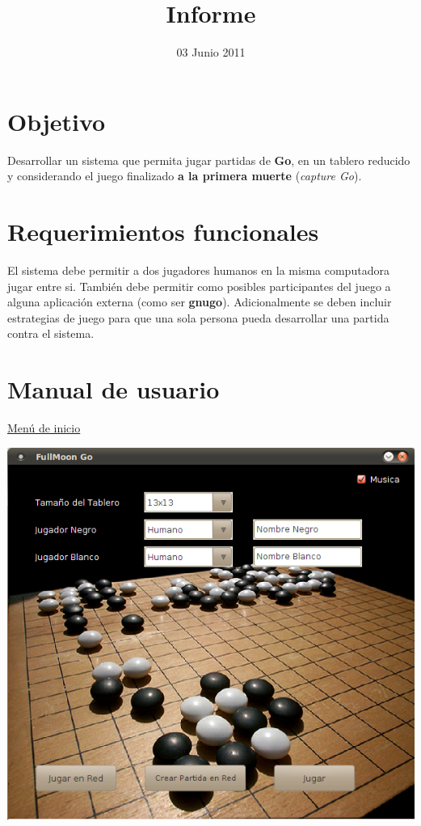 \documentclass[11pt]{article}
\title{Informe}
\author{}
\date{03 Junio 2011}
\begin{document}
\thispagestyle{empty}
  

\setcounter{tocdepth}{3}
\tableofcontents

\newpage
\section{Objetivo}
\label{sec-1}

  Desarrollar un sistema que permita jugar partidas de \textbf{Go}, en un
  tablero reducido y considerando el juego finalizado \textbf{a la primera   muerte} (\emph{capture Go}).

\section{Requerimientos funcionales}
\label{sec-2}

  El sistema debe permitir a dos jugadores humanos en la misma
  computadora jugar entre si. También debe permitir como posibles
  participantes del juego a alguna aplicación externa (como ser
  \textbf{gnugo}). Adicionalmente se deben incluir estrategias de juego para
  que una sola persona pueda desarrollar una partida contra el
  sistema.

\section{Manual de usuario}
\label{sec-3}
\underline{Men\'u de inicio}
\begin{center}
 \includegraphics[scale=0.55]{./Diagramas/captura_fullmoon.png}
\end{center}
\end{document}

